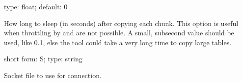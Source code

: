 \documentclass[letterpaper,10pt,english]{sphinxmanual}
\begin{document}
\begin{fulllineitems}
\label{\detokenize{mariadb-schema-change:cmdoption-mariadb-schema-change-sleep}}
type: float; default: 0

How long to sleep (in seconds) after copying each chunk. This option is useful
when throttling by {\hyperref[\detokenize{mariadb-schema-change:cmdoption-mariadb-schema-change-max-lag}]{}} and {\hyperref[\detokenize{mariadb-schema-change:cmdoption-mariadb-schema-change-max-load}]{}} are not possible.
A small, sub\sphinxhyphen{}second value should be used, like 0.1, else the tool could take
a very long time to copy large tables.

\end{fulllineitems}


\begin{fulllineitems}
\label{\detokenize{mariadb-schema-change:cmdoption-mariadb-schema-change-socket}}
short form: \sphinxhyphen{}S; type: string

Socket file to use for connection.

\end{fulllineitems}

\end{document}
